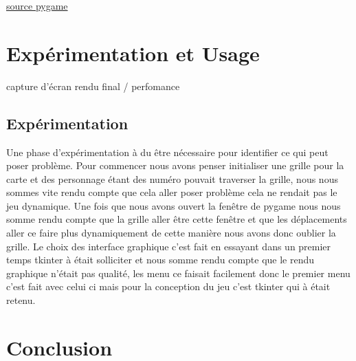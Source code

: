 \documentclass[a4paper, 11pt]{article}
\begin{document}
\href{http://www.pygame.org/docs/}{source pygame}

\section{Expérimentation et Usage}
capture d'écran rendu final / perfomance 

\subsection{Expérimentation}
Une phase d'expérimentation à du être nécessaire pour identifier ce qui peut poser problème.
Pour commencer nous avons penser initialiser une grille pour la carte et des personnage étant des numéro pouvait traverser la grille, nous nous sommes vite rendu compte que cela aller poser problème cela ne rendait pas le jeu dynamique.
Une fois que nous avons ouvert la fenêtre de pygame nous nous somme rendu compte que la grille aller être cette fenêtre et que les déplacements aller ce faire plus dynamiquement de cette manière nous avons donc oublier la grille.
Le choix des interface graphique c'est fait en essayant dans un premier temps tkinter à était solliciter et nous somme rendu compte que le rendu graphique n'était pas qualité, les menu ce faisait facilement donc le premier menu c'est fait avec celui ci mais pour la conception du jeu c'est tkinter qui à était retenu.

\section{Conclusion}
\end{document}
